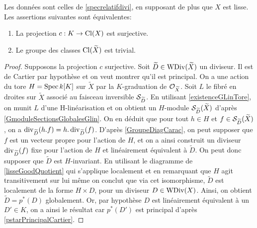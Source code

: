 \begin{thm}\label{clgtrivial}
Les données sont celles de \ref{specrelatifdivi}, en supposant de plus que $X$ est lisse. Les assertions suivantes sont équivalentes:
\begin{enumerate}
\item La projection $c:K\rightarrow \operatorname{Cl}(X)$ est surjective.
\item Le groupe des classes $\operatorname{Cl}(\widetilde{X})$ est trivial.
\end{enumerate}
\end{thm}
\begin{proof}
Supposons la projection $c$ surjective. Soit $\widetilde{D}\in \operatorname{WDiv}(\widetilde{X})$ un diviseur. Il est de Cartier par hypothèse et on veut montrer qu'il est principal. On a une action du tore $H=\operatorname{Spec} k[K]$ sur $\widetilde{X}$ par la $K$-graduation de $\mathcal{O}_{\widetilde{X}}$. Soit $L$ le fibré en droites sur $\widetilde{X}$ associé au faisceau inversible $\mathcal{S}_{\widetilde{D}}$. En utilisant \ref{existenceGLinTore}, on munit $L$ d'une H-linéarisation et on obtient un $H$-module $\mathcal{S}_{\widetilde{D}}(\widetilde{X})$ d'après \ref{GmoduleSectionsGlobalesGlin}. On en déduit que pour tout $h\in H$ et $f\in \mathcal{S}_{\widetilde{D}}(\widetilde{X})$, on a $\operatorname{div}_{\widetilde{D}}(h.f)=h.\operatorname{div}_{\widetilde{D}}(f)$. D'après \ref{GroupeDiagCarac}, on peut supposer que $f$ est un vecteur propre pour l'action de $H$, et on a ainsi construit un diviseur $\operatorname{div}_{\widetilde{D}}(f)$ fixe pour l'action de $H$ et linéairement équivalent à $\widetilde{D}$. On peut donc supposer que $\widetilde{D}$ est $H$-invariant. En utilisant le diagramme de \ref{lisseGoodQuotient} qui s'applique localement et en remarquant que $H$ agit transitivement sur lui même on conclut que via cet isomorphisme, $\widetilde{D}$ est localement de la forme $H\times D$, pour un diviseur $D\in \operatorname{WDiv}(X)$. Ainsi, on obtient $\widetilde{D}=p^*(D)$ globalement. Or, par hypothèse $D$ est linéairement équivalent à un $D'\in K$, on a ainsi le résultat car $p^*(D')$ est principal d'après \ref{pstarPrincipalCartier}.


\end{proof}
